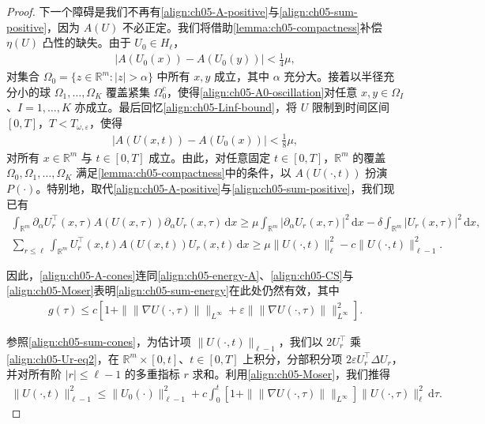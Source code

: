 \documentclass[../../main.tex]{subfiles}
\begin{document}
\begin{proof}
下一个障碍是我们不再有\eqref{align:ch05-A-positive}与\eqref{align:ch05-sum-positive}，因为 $A(U)$ 不必正定。我们将借助\cref{lemma:ch05-compactness}补偿 $\eta(U)$ 凸性的缺失。由于 $U_{0}\in H_{\ell}$，
\begin{align}
|A(U_{0}(x))-A(U_{0}(y))|<\frac{1}{4}\mu,\label{align:ch05-A0-oscillation}
\end{align}
对集合 $\Omega_{0}=\{z\in\mathbb{R}^{m}:|z|>\alpha\}$ 中所有 $x,y$ 成立，其中 $\alpha$ 充分大。接着以半径充分小的球 $\Omega_{1},\ldots,\Omega_{K}$ 覆盖紧集 $\Omega_{0}^{c}$，使得\eqref{align:ch05-A0-oscillation}对任意 $x,y\in\Omega_{I}$、$I=1,\ldots,K$ 亦成立。最后回忆\eqref{align:ch05-Linf-bound}，将 $U$ 限制到时间区间 $[0,T]$，$T<T_{\omega,\varepsilon}$，使得
\begin{align}
|A(U(x,t))-A(U_{0}(x))|<\frac{1}{8}\mu,\label{align:ch05-AU-oscillation}
\end{align}
对所有 $x\in\mathbb{R}^{m}$ 与 $t\in[0,T]$ 成立。由此，对任意固定 $t\in[0,T]$，$\mathbb{R}^{m}$ 的覆盖 $\Omega_{0},\Omega_{1},\ldots,\Omega_{K}$ 满足\cref{lemma:ch05-compactness}中的条件，以 $A(U(\cdot,t))$ 扮演 $P(\cdot)$。特别地，取代\eqref{align:ch05-A-positive}与\eqref{align:ch05-sum-positive}，我们现已有
\begin{align}
\int_{\mathbb{R}^{m}}\partial_{\alpha}U_{r}^{\top}(x,\tau)A(U(x,\tau))\partial_{\alpha}U_{r}(x,\tau)\,\mathrm{d}x
\geqslant\mu\int_{\mathbb{R}^{m}}|\partial_{\alpha}U_{r}(x,\tau)|^{2}\,\mathrm{d}x-\delta\int_{\mathbb{R}^{m}}|U_{r}(x,\tau)|^{2}\,\mathrm{d}x,\label{align:ch05-A-cones}
\end{align}
\begin{align}
\sum_{r\leqslant\ell}\int_{\mathbb{R}^{m}}U_{r}^{\top}(x,t)A(U(x,t))U_{r}(x,t)\,\mathrm{d}x\geqslant\mu\|U(\cdot,t)\|_{\ell}^{2}-c\|U(\cdot,t)\|_{\ell-1}^{2}.\label{align:ch05-sum-cones}
\end{align}

因此，\eqref{align:ch05-A-cones}连同\eqref{align:ch05-energy-A}、\eqref{align:ch05-CS}与\eqref{align:ch05-Moser}表明\eqref{align:ch05-sum-energy}在此处仍然有效，其中
\begin{align}
g(\tau)\leqslant c[1+\|\|\nabla U(\cdot,\tau)\|\|_{L^{\infty}}+\varepsilon\|\|\nabla U(\cdot,\tau)\|\|_{L^{\infty}}^{2}].\label{align:ch05-g-cones}
\end{align}

参照\eqref{align:ch05-sum-cones}，为估计项 $\|U(\cdot,t)\|_{\ell-1}$，我们以 $2U_{r}^{\top}$ 乘\eqref{align:ch05-Ur-eq2}，在 $\mathbb{R}^{m}\times[0,t]$、$t\in[0,T]$ 上积分，分部积分项 $2\varepsilon U_{r}^{\top}\Delta U_{r}$，并对所有阶 $|r|\leqslant\ell-1$ 的多重指标 $r$ 求和。利用\eqref{align:ch05-Moser}，我们推得
\begin{align}
\|U(\cdot,t)\|_{\ell-1}^{2}\leqslant\|U_{0}(\cdot)\|_{\ell-1}^{2}+c\int_{0}^{t}[1+\|\|\nabla U(\cdot,\tau)\|\|_{L^{\infty}}]\|U(\cdot,\tau)\|_{\ell}^{2}\,\mathrm{d}\tau.\label{align:ch05-Ul1-est}
\end{align}


\end{proof}
\end{document}
